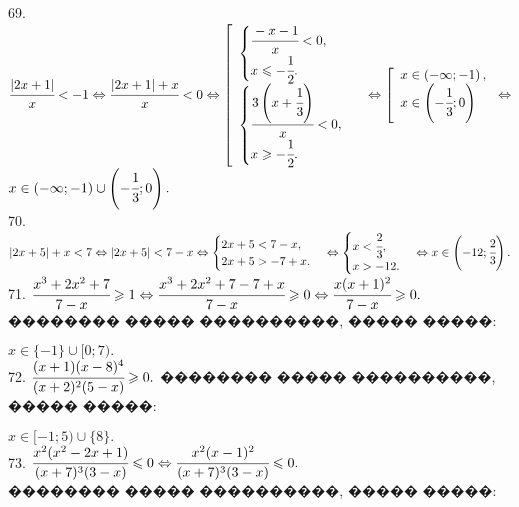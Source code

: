 \documentclass[12pt]{article}
\begin{document}
69. $\cfrac{|2x+1|}{x}<-1\Leftrightarrow\cfrac{|2x+1|+x}{x}<0\Leftrightarrow
\left[\begin{array}{l}\begin{cases}\cfrac{-x-1}{x}<0,\\ x\leqslant-\cfrac{1}{2}.\end{cases}\\ \begin{cases}\cfrac{3\left(x+\cfrac{1}{3}\right)}{x}<0,\\ x\geqslant-\cfrac{1}{2}.\end{cases}  \end{array}\right.\Leftrightarrow\left[\begin{array}{l} x\in\left(-\infty;-1\right),\\
x\in\left(-\cfrac{1}{3};0\right)\end{array}\right.\Leftrightarrow$\\$ x\in\left(-\infty;-1\right)\cup\left(-\cfrac{1}{3};0\right).$\\
70. $|2x+5|+x<7\Leftrightarrow |2x+5|<7-x\Leftrightarrow \begin{cases}2x+5<7-x,\\ 2x+5>-7+x.\end{cases}
\Leftrightarrow \begin{cases}x<\cfrac{2}{3},\\ x>-12.\end{cases}\Leftrightarrow x\in\left(-12;\cfrac{2}{3}\right).$\\
71. $\cfrac{x^3+2x^2+7}{7-x}\geqslant1\Leftrightarrow\cfrac{x^3+2x^2+7-7+x}{7-x}\geqslant0\Leftrightarrow
\cfrac{x(x+1)^2}{7-x}\geqslant0.$ �������� ����� ����������, ����� �����:
\begin{figure}[ht!]
\end{figure}
$x\in\{-1\}\cup[0;7).$\\
72. $\cfrac{(x+1)(x-8)^4}{(x+2)^2(5-x)}\geqslant0.$ �������� ����� ����������, ����� �����:
\begin{figure}[ht!]
\end{figure}
$x\in[-1;5)\cup\{8\}.$\\
73. $\cfrac{x^2(x^2-2x+1)}{(x+7)^3(3-x)}\leqslant0\Leftrightarrow\cfrac{x^2(x-1)^2}{(x+7)^3(3-x)}\leqslant0.$\\ �������� ����� ����������, ����� �����:
\begin{figure}[ht!]
\end{figure}
\end{document}
